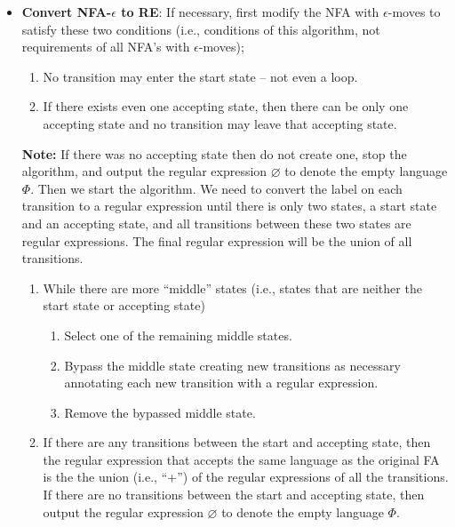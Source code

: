 \documentclass{report}
\begin{document}
\begin{itemize}
    \item \textbf{Convert NFA-$\epsilon$ to RE}:
        If necessary, first modify the NFA with $\epsilon$-moves to satisfy these two conditions (i.e., conditions of this algorithm, not requirements of all NFA’s with $\epsilon$-moves);
        \begin{enumerate}[label=\alph*)]
            \item No transition may enter the start state – not even a loop. 
            \item  If there exists even one accepting state, then there can be only one accepting state and no transition may leave that accepting state.
        \end{enumerate}
        \bigbreak \noindent 
        \textbf{Note:} If there was no accepting state then do not create one, stop the algorithm, and output the regular expression $\varnothing$ to denote the empty language $\Phi$.
        \bigbreak \noindent 
        Then we start the algorithm. We need to convert the label on each transition to a regular expression until there is only two states, a start state and an accepting state, and all transitions between these two states are regular expressions. The final regular expression will be the union of all transitions.
        \begin{enumerate}
            \item  While there are more “middle” states (i.e., states that are neither the start state or accepting state)
                \begin{enumerate}[label=(\roman*)]
                    \item Select one of the remaining middle states.
                    \item Bypass the middle state creating new transitions as necessary annotating each new transition with a regular expression.
                    \item Remove the bypassed middle state.
                \end{enumerate}
            \item If there are any transitions between the start and accepting state, then the regular expression that accepts the same language as the original FA is the the union (i.e., “+”) of the regular expressions of all the transitions. 
                \bigbreak \noindent 
                If there are no transitions between the start and accepting state, then output the regular expression $\varnothing$ to denote the empty language $\Phi$.
        \end{enumerate}

\end{itemize}
\end{document}
